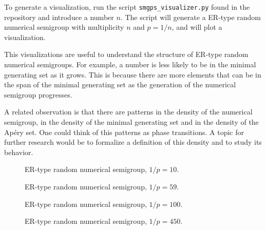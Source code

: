 To generate a visualization, run the script \verb|smgps_visualizer.py| found in the repository \cite{morales2023} and introduce a number $n$. The script will generate a ER-type random numerical semigroup with multiplicity $n$ and $p = 1/n$, and will plot a visualization. \par

This visualizations are useful to understand the structure of ER-type random numerical semigroups. For example, a number is less likely to be in the minimal generating set as it grows. This is because there are more elements that can be in the span of the minimal generating set as the generation of the numerical semigroup progresses. \par

A related observation is that there are patterns in the density of the numerical semigroup, in the density of the minimal generating set and in the density of the Apéry set. One could think of this patterns as phase transitions. A topic for further research would be to formalize a definition of this density and to study its behavior. \par

\begin{figure}
    \begin{center}
        
    \end{center}
    \caption{ER-type random numerical semigroup, $1/p = 10$.}
\end{figure}

\begin{figure}
    \begin{center}
        
    \end{center}
    \caption{ER-type random numerical semigroup, $1/p = 59$.}
\end{figure}

\begin{figure}
    \begin{center}
        
    \end{center}
    \caption{ER-type random numerical semigroup, $1/p = 100$.}
\end{figure}

\begin{figure}
    \begin{center}
        
    \end{center}
    \caption{ER-type random numerical semigroup, $1/p = 450$.}
\end{figure}



